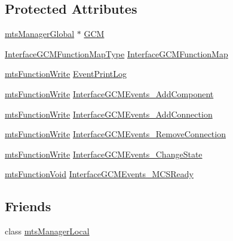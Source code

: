 \subsection*{Protected Attributes}
\begin{DoxyCompactItemize}
\item 
\hyperlink{classmts_manager_global}{mts\-Manager\-Global} $\ast$ \hyperlink{classmts_manager_component_server_a59e64d383adcaa04d1e89e4596864209}{G\-C\-M}
\item 
\hyperlink{classmts_manager_component_server_a9b456473c566d9993274d3de0f124f7c}{Interface\-G\-C\-M\-Function\-Map\-Type} \hyperlink{classmts_manager_component_server_aba31458f9efbd9bd8f3ffc9335f56c9e}{Interface\-G\-C\-M\-Function\-Map}
\item 
\hyperlink{classmts_function_write}{mts\-Function\-Write} \hyperlink{classmts_manager_component_server_a183cc63d73da8ba811bab26d4c7ce2d7}{Event\-Print\-Log}
\item 
\hyperlink{classmts_function_write}{mts\-Function\-Write} \hyperlink{classmts_manager_component_server_a5ba7772f5e8d7da177f8280f61ca8610}{Interface\-G\-C\-M\-Events\-\_\-\-Add\-Component}
\item 
\hyperlink{classmts_function_write}{mts\-Function\-Write} \hyperlink{classmts_manager_component_server_a45cc7ef85a7b47f504cecfe23d40590f}{Interface\-G\-C\-M\-Events\-\_\-\-Add\-Connection}
\item 
\hyperlink{classmts_function_write}{mts\-Function\-Write} \hyperlink{classmts_manager_component_server_a11a899e797a81a3e84bd4bc7c2025344}{Interface\-G\-C\-M\-Events\-\_\-\-Remove\-Connection}
\item 
\hyperlink{classmts_function_write}{mts\-Function\-Write} \hyperlink{classmts_manager_component_server_a169604bf1d8337dc3b4a4d7017d61982}{Interface\-G\-C\-M\-Events\-\_\-\-Change\-State}
\item 
\hyperlink{classmts_function_void}{mts\-Function\-Void} \hyperlink{classmts_manager_component_server_a3c150e5ac5a8a4b7b68d30874e8daf73}{Interface\-G\-C\-M\-Events\-\_\-\-M\-C\-S\-Ready}
\end{DoxyCompactItemize}
\subsection*{Friends}
\begin{DoxyCompactItemize}
\item 
class \hyperlink{classmts_manager_component_server_a31c1c611dbb103ac58ed40d84960baa0}{mts\-Manager\-Local}
\end{DoxyCompactItemize}
